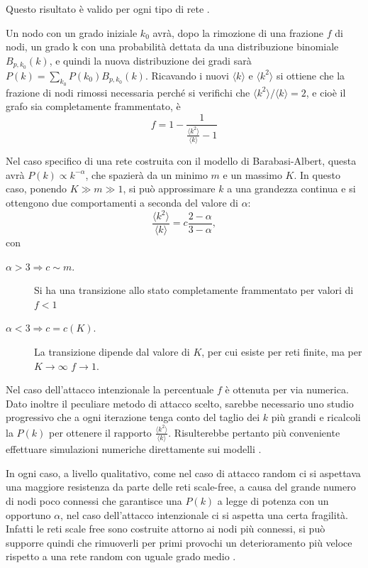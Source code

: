 Questo risultato \`e valido per ogni tipo di rete \parencite{Cohen2000}.

Un nodo con un grado iniziale $k_0$ avr\`a, dopo la rimozione di una frazione $f$ di nodi, un grado k con una probabilit\`a dettata da una distribuzione binomiale $B_{p,k_0}(k)$, e quindi la nuova distribuzione dei gradi sar\`a $P(k) = \sum_{k_0} P(k_0)B_{p,k_0}(k)$. Ricavando i nuovi $\langle k \rangle$ e $\langle k^2 \rangle$ si ottiene che la frazione di nodi rimossi necessaria perch\'e si verifichi che $\langle k^2\rangle/\langle k \rangle = 2$, e cio\`e il grafo sia completamente frammentato, \`e 
\begin{equation}
\label{eq:criterionfreq}
	f = 1 - \frac{1}{\frac{\langle k^2 \rangle}{\langle k \rangle}-1}
\end{equation}

Nel caso specifico di una rete costruita con il modello di Barabasi-Albert, questa avr\`a $P(k)\propto k^{-\alpha}$, che spazier\`a da un minimo $m$ e un massimo $K$. In questo caso, ponendo $K\gg m \gg 1$, si pu\`o approssimare $k$ a una grandezza continua e si ottengono due comportamenti a seconda del valore di $\alpha$:
 \[\frac{\langle k^2\rangle}{\langle k \rangle} = c \frac{2-\alpha}{3-\alpha},\]
 con
\begin{description}
	\item[$\alpha > 3 \Rightarrow c\sim m.$] Si ha una transizione allo stato completamente frammentato per valori di $f<1$
	\item[$\alpha < 3 \Rightarrow c=c(K).$] La transizione dipende dal valore di $K$, per cui esiste per reti finite, ma per $K \rightarrow \infty$ $f\rightarrow1$.
\end{description}

Nel caso dell'attacco intenzionale la percentuale $f$ \`e ottenuta per via numerica. Dato inoltre il peculiare metodo di attacco scelto, sarebbe necessario uno studio progressivo che a ogni iterazione tenga conto del taglio dei $k$ pi\`u grandi e ricalcoli la $P(k)$ per ottenere il rapporto $\frac{\langle k^2 \rangle}{\langle k \rangle}$. Risulterebbe pertanto pi\`u conveniente effettuare simulazioni numeriche direttamente sui modelli \parencite{Cohen2001}.

In ogni caso, a livello qualitativo, come nel caso di attacco random ci si aspettava una maggiore resistenza da parte delle reti scale-free, a causa del grande numero di nodi poco connessi che garantisce una $P(k)$ a legge di potenza con un opportuno $\alpha$, nel caso dell'attacco intenzionale ci si aspetta una certa fragilit\`a. Infatti le reti scale free sono costruite attorno ai nodi pi\`u connessi, si pu\`o supporre quindi che rimuoverli per primi provochi un deterioramento pi\`u veloce rispetto a una rete random con uguale grado medio \parencite{Barbalbert2002}.

